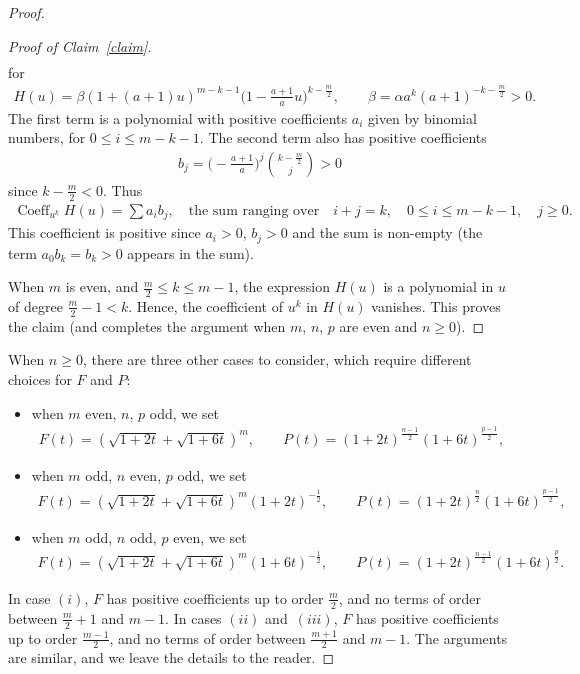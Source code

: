 \begin{proof}
\begin{proof}[Proof of Claim~\ref{claim}]
\begin{gather*}
\end{gather*}
for
\begin{gather*}
H(u)=\beta (1+(a+1)u)^{m-k-1} \biggl(1-\frac{a+1}{a}u\biggr)^{k-\frac{m}{2}}, \qquad \beta=\alpha a^{k} (a+1)^{-k-\frac{m}{2}}>0.
\end{gather*}
The first term is a polynomial with positive coefficients $a_i$ given by binomial numbers, for $0\leq i\leq m-k-1$. The second term also has positive coefficients
\begin{gather*}
b_j=\biggl(-\frac{a+1}{a}\biggr)^j\binom{k-\frac{m}{2}}{j}>0
\end{gather*}
since $k-\frac{m}{2}<0$. Thus
\begin{gather*}
\operatorname{Coeff}_{u^k} H(u)=\!\sum a_i b_j,\quad \text{the sum ranging over}\!\quad i+j=k, \quad 0\leq i\leq m-k-1, \quad j\geq 0.
\end{gather*}
This coefficient is positive since $a_i>0$, $b_j> 0$ and the sum is non-empty (the term $a_0b_k=b_k>0$ appears in the sum).

When $m$ is even, and $\frac{m}{2}\leq k\leq m-1$, the expression $H(u)$ is a polynomial in $u$ of degree $\frac{m}{2}-1<k$. Hence, the coefficient of $u^k$ in $H(u)$ vanishes.
This proves the claim (and completes the argument when $m$, $n$, $p$ are even and $n\geq 0$).
\end{proof}

When $n\geq 0$, there are three other cases to consider, which require different choices for $F$ and $P$:
\begin{itemize}\itemsep=0pt
\item [$(i)$] when $m$ even, $n$, $p$ odd, we set
\begin{gather*}
F(t)=\left(\sqrt{1+2t}+\sqrt{1+6t}\right)^m, \qquad
P(t)=(1+2t)^{\frac{n-1}{2}} (1+6t)^{\frac{p-1}{2}},
\end{gather*}
\item [$(ii)$] when $m$ odd, $n$ even, $p$ odd, we set
\begin{gather*}
F(t)=\left(\sqrt{1+2t}+\sqrt{1+6t}\right)^m {(1+2t)}^{-\frac{1}{2}}, \qquad
P(t)=(1+2t)^{\frac{n}{2}} (1+6t)^{\frac{p-1}{2}},
\end{gather*}
\item [$(iii)$] when $m$ odd, $n$ odd, $p$ even, we set
\begin{gather*}
F(t)=\left(\sqrt{1+2t}+\sqrt{1+6t}\right)^m (1+6t)^{-\frac{1}{2}}, \qquad
P(t)=(1+2t)^{\frac{n-1}{2}} (1+6t)^{\frac{p}{2}}.
\end{gather*}
\end{itemize}
In case $(i)$, $F$ has positive coefficients up to order $\frac{m}{2}$, and no terms of order between $\frac{m}{2}+1$ and $m-1$.
In cases $(ii)$ and~$(iii)$, $F$ has positive coefficients up to order $\frac{m-1}{2}$, and no terms of order between $\frac{m+1}{2}$ and $m-1$. The arguments are similar, and we leave the details to the reader.


\end{proof}
